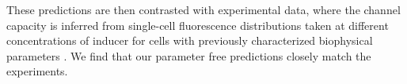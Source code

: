 %
%

These predictions are then contrasted with experimental data, where the channel
capacity is inferred from single-cell fluorescence distributions taken at
different concentrations of inducer for cells with previously characterized
biophysical parameters \cite{Garcia2011c, Razo-Mejia2018}. We find that our
parameter free predictions closely match the experiments. 

